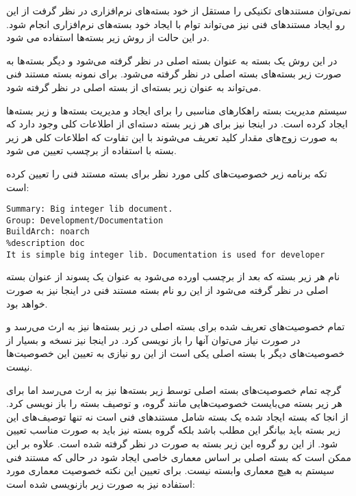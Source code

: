 نمی‌توان مستندهای تکنیکی را مستقل از خود بسته‌های نرم‌افزاری در نظر گرفت از این
رو ایجاد مستندهای فنی نیز می‌تواند توام با ایجاد خود بسته‌های نرم‌افزاری انجام
شود. در این حالت از روش زیر بسته‌ها استفاده می شود.

در این روش یک بسته به عنوان بسته اصلی در نظر گرفته می‌شود و دیگر بسته‌ها به صورت
زیر بسته‌های بسته اصلی در نظر گرفته می‌شود. برای نمونه بسته مستند فنی می‌تواند
به عنوان زیر بسته‌ای از بسته اصلی  در نظر گرفته شود.

سیستم مدیریت بسته  راهکارهای مناسبی را برای ایجاد و مدیریت بسته‌ها و زیر
بسته‌ها ایجاد کرده است. در اینجا نیز برای هر زیر بسته دسته‌ای از اطلاعات کلی
وجود دارد که به صورت زوج‌های مقدار کلید تعریف می‌شوند با این تفاوت که اطلاعات
کلی هر زیر بسته با استفاده از برچسب  تعیین می شود.

تکه برنامه زیر خصوصیت‌های کلی مورد نظر برای بسته مستند فنی را تعیین کرده است:

\begin{latin}
\lstset{language=TeX}  
\begin{lstlisting}[frame=single] 
%package doc
Summary: Big integer lib document.
Group: Development/Documentation
BuildArch: noarch
%description doc
It is simple big integer lib. Documentation is used for developer
\end{lstlisting}
\end{latin}

نام هر زیر بسته که بعد از برچسب  اورده می‌شود به عنوان یک پسوند از
عنوان بسته اصلی در نظر گرفته می‌شود از این رو نام بسته مستند فنی در اینجا نیز
به صورت  خواهد بود.

تمام خصوصیت‌های تعریف شده برای بسته اصلی در زیر بسته‌ها نیز به ارث می‌رسد و در
صورت نیاز می‌توان آنها را باز نویسی کرد. در اینجا نیز نسخه و بسیار از خصوصیت‌های
دیگر با بسته اصلی یکی است از این رو نیازی به تعیین این خصوصیت‌ها نیست. 

گرچه تمام خصوصیت‌های بسته اصلی توسط زیر بسته‌ها نیز به ارث می‌رسد اما برای هر
زیر بسته می‌بایست خصوصیت‌هایی مانند گروه، و توصیف بسته را باز نویسی کرد. از انجا
که بسته ایجاد شده یک بسته شامل مستندهای فنی است نه تنها توصیف‌های این زیر بسته
باید بیانگر این مطلب باشد بلکه گروه بسته نیز باید به صورت مناسب تعیین شود. از
این رو گروه این زیر بسته به صورت  در نظر گرفته شده
است. علاوه بر این ممکن است که بسته اصلی بر اساس معماری خاصی ایجاد شود در حالی که
مستند فنی سیستم به هیچ معماری وابسته نیست. برای تعیین این نکته خصوصیت معماری
مورد استفاده نیز به صورت زیر بازنویسی شده است:


